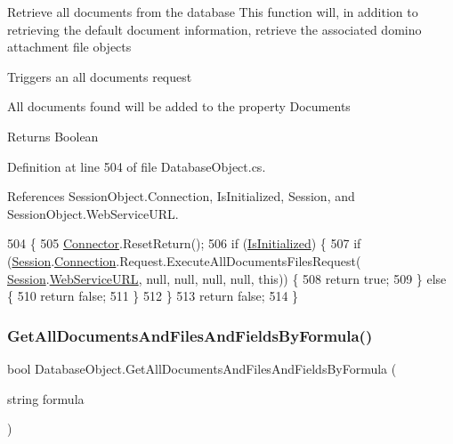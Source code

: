 Retrieve all documents from the database This function will, in addition to retrieving the default document information, retrieve the associated domino attachment file objects 

Triggers an all documents request

All documents found will be added to the property \textquotesingle{}Documents\textquotesingle{}

\begin{DoxyReturn}{Returns}
Boolean
\end{DoxyReturn}


Definition at line 504 of file Database\+Object.\+cs.



References Session\+Object.\+Connection, Is\+Initialized, Session, and Session\+Object.\+Web\+Service\+U\+RL.


\begin{DoxyCode}
504                                           \{
505         \mbox{\hyperlink{class_connector}{Connector}}.ResetReturn();
506         \textcolor{keywordflow}{if} (\mbox{\hyperlink{class_database_object_a5fe036d32a30eb10d1b3f6a30263f740}{IsInitialized}}) \{
507             \textcolor{keywordflow}{if} (\mbox{\hyperlink{class_database_object_aa8484162b7d2a7c4c9426bca13c64c07}{Session}}.\mbox{\hyperlink{class_session_object_a014bdbf705a753540e19bfb53030c55c}{Connection}}.Request.ExecuteAllDocumentsFilesRequest(
      \mbox{\hyperlink{class_database_object_aa8484162b7d2a7c4c9426bca13c64c07}{Session}}.\mbox{\hyperlink{class_session_object_a697c071c812fbf7ad1166b896fb44c16}{WebServiceURL}}, null, null, null, null, \textcolor{keyword}{this})) \{
508                 \textcolor{keywordflow}{return} \textcolor{keyword}{true};
509             \} \textcolor{keywordflow}{else} \{
510                 \textcolor{keywordflow}{return} \textcolor{keyword}{false};
511             \}
512         \}
513         \textcolor{keywordflow}{return} \textcolor{keyword}{false};
514     \}
\end{DoxyCode}
\mbox{\label{class_database_object_ae6b850b56e26c6960ec2b7ff4d78372c}} 
\subsubsection{\texorpdfstring{Get\+All\+Documents\+And\+Files\+And\+Fields\+By\+Formula()}{GetAllDocumentsAndFilesAndFieldsByFormula()}\hspace{0.1cm}{\footnotesize\ttfamily [1/2]}}
{\footnotesize\ttfamily bool Database\+Object.\+Get\+All\+Documents\+And\+Files\+And\+Fields\+By\+Formula (\begin{DoxyParamCaption}\item[{string}]{formula }\end{DoxyParamCaption})}



